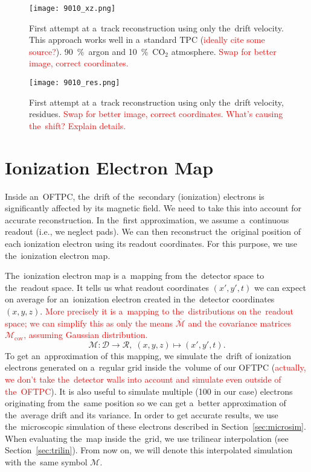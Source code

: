 		\begin{figure}
			\centering
			\texttt{[image: 9010\_xz.png]}
			\caption{First attempt at a~track reconstruction using only the~drift velocity. This approach works well in a~standard \ac{TPC} (\textcolor{red}{ideally cite some source?}). 90~\%~argon and 10~\%~CO$_2$ atmosphere. \textcolor{red}{Swap for better image, correct coordinates.}}
			\label{fig:9010xz}
		\end{figure}
		
		\begin{figure}
			\centering
			\texttt{[image: 9010\_res.png]}
			\caption{First attempt at a~track reconstruction using only the~drift velocity, residues. \textcolor{red}{Swap for better image, correct coordinates. What's causing the~shift? Explain details.}}
			\label{fig:9010res}
		\end{figure}
	
	\section{Ionization Electron Map}
	\label{sec:map}
		Inside an~\ac{OFTPC}, the~drift of the~secondary (ionization) electrons is significantly affected by its magnetic field. We need to take this into account for accurate reconstruction. In the~first approximation, we assume a~continuous readout (i.e., we neglect pads). We can then reconstruct the~original position of each ionization electron using its readout coordinates. For this purpose, we use the~ionization electron map.
		
		The~ionization electron map is a~mapping from the~detector space to the~readout space. It tells us what readout coordinates $(x',y',t)$ we can expect on average for an~ionization electron created in the~detector coordinates $(x,y,z)$. \textcolor{red}{More precisely it is a~mapping to the~distributions on the~readout space; we can simplify this as only the means $\overbar{\mathcal{M}}$ and the covariance matrices $\mathcal{M}_\text{cov}$, assuming Gaussian distribution.}
			\begin{equation}
				\mathcal{M}: \mathcal{D} \longrightarrow \mathcal{R},\; (x,y,z) \longmapsto (x',y',t).
			\end{equation}
		To get an~approximation of this mapping, we simulate the~drift of ionization electrons generated on a~regular grid inside the~volume of our \ac{OFTPC} (\textcolor{red}{actually, we don't take the~detector walls into account and simulate even outside of the~\ac{OFTPC}}). It is also useful to simulate multiple (100 in our case) electrons originating from the~same position so we can get a~better approximation of the~average drift and its variance. In order to get accurate results, we use the~microscopic simulation of these electrons described in Section~\ref{sec:microsim}. When evaluating the~map inside the~grid, we use trilinear interpolation (see Section~\ref{sec:trilin}). From now on, we will denote this interpolated simulation with the~same symbol $\mathcal{M}$.
		

